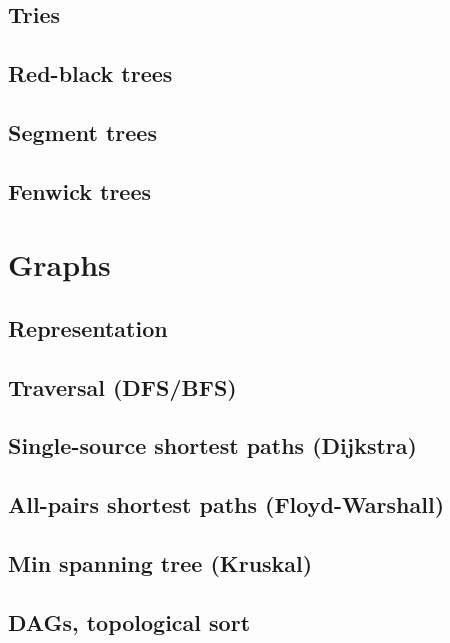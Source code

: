 \documentclass[10pt]{book}
\newif\iftodos
\newcommand{\todo}[1]{\iftodos\textcolor{red}{[TODO: #1]}\fi}
\begin{document}
\section{Tries}

\section{Red-black trees}

\section{Segment trees}

\section{Fenwick trees}

\chapter{Graphs}

\section{Representation}

\todo{Adjacency matrix, adjacency maps.  Edge objects. Implicit graphs.}

\section{Traversal (DFS/BFS)}

\todo{Code for DFS/BFS with level labelling, parent map.}

\section{Single-source shortest paths (Dijkstra)}

\section{All-pairs shortest paths (Floyd-Warshall)} \label{sec:floydwarshall}

\section{Min spanning tree (Kruskal)} \label{sec:kruskal}

\section{DAGs, topological sort}
\end{document}
